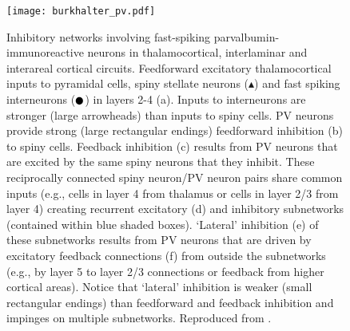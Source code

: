 \begin{figure}
	\centering
        \texttt{[image: burkhalter\_pv.pdf]}
	\caption{Inhibitory networks involving fast-spiking
        parvalbumin-immunoreactive neurons in thalamocortical,
        interlaminar and interareal cortical circuits. Feedforward
        excitatory thalamocortical inputs to pyramidal cells, spiny
        stellate neurons ($\blacktriangle$) and fast spiking
        interneurons ($\newmoon$) in layers 2-4 (a). Inputs to
        interneurons are stronger (large arrowheads) than inputs to
        spiny cells. PV neurons provide strong (large rectangular
        endings) feedforward inhibition (b) to spiny cells. Feedback
        inhibition (c) results from PV neurons that are excited by the
        same spiny neurons that they inhibit. These reciprocally
        connected spiny neuron/PV neuron pairs share common inputs
        (e.g., cells in layer 4 from thalamus or cells in layer 2/3
        from layer 4) creating recurrent excitatory (d) and inhibitory
        subnetworks (contained within blue shaded boxes). ‘Lateral’
        inhibition (e) of these subnetworks results from PV neurons
        that are driven by excitatory feedback connections (f) from
        outside the subnetworks (e.g., by layer 5 to layer 2/3
        connections or feedback from higher cortical areas). Notice
        that ‘lateral’ inhibition is weaker (small rectangular
        endings) than feedforward and feedback inhibition and impinges
        on multiple subnetworks. Reproduced from
        \cite{Burkhalter2008}.}
	\label{burkhalterpv}
\end{figure}

